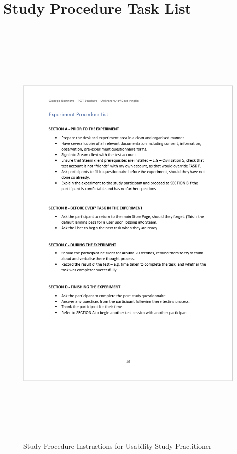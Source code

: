 \section{Study Procedure Task List}
\begin{figure}[H]
\includegraphics[width=16cm,height=22cm]{Screenshots/StudyMaterialScreenshots/studyProcedureList.png}
\caption{Study Procedure Instructions for Usability Study Practitioner}
\end{figure}
